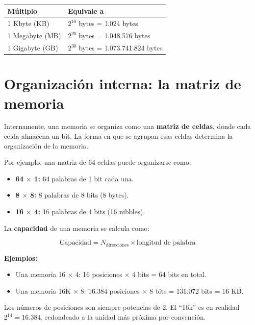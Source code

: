 \begin{table}[H]
\centering
\begin{tabular}{ll}
\toprule
Múltiplo & Equivale a \\
\midrule
1 Kbyte (KB) & $2^{10}$ bytes = 1.024 bytes \\
1 Megabyte (MB) & $2^{20}$ bytes = 1.048.576 bytes \\
1 Gigabyte (GB) & $2^{30}$ bytes = 1.073.741.824 bytes \\
\bottomrule
\end{tabular}
\end{table}

\section{Organización interna: la matriz de memoria}

Internamente, una memoria se organiza como una \textbf{matriz de celdas}, donde cada celda almacena un bit. La forma en que se agrupan esas celdas determina la organización de la memoria.


Por ejemplo, una matriz de 64 celdas puede organizarse como:

\begin{itemize}
  \item \textbf{64 $\times$ 1:} 64 palabras de 1 bit cada una.
  \item \textbf{8 $\times$ 8:} 8 palabras de 8 bits (8 bytes).
  \item \textbf{16 $\times$ 4:} 16 palabras de 4 bits (16 nibbles).
\end{itemize}

La \textbf{capacidad} de una memoria se calcula como:

$$\text{Capacidad} = N_{\text{direcciones}} \times \text{longitud de palabra}$$

\textbf{Ejemplos:}

\begin{itemize}
  \item Una memoria 16 $\times$ 4: 16 posiciones $\times$ 4 bits = 64 bits en total.
  \item Una memoria 16K $\times$ 8: $16.384$ posiciones $\times$ 8 bits = 131.072 bits = 16 KB.
\end{itemize}

\begin{notabox}
Los números de posiciones son siempre potencias de 2. El ``16k'' es en realidad $2^{14} = 16.384$, redondeado a la unidad más próxima por convención.
\end{notabox}

